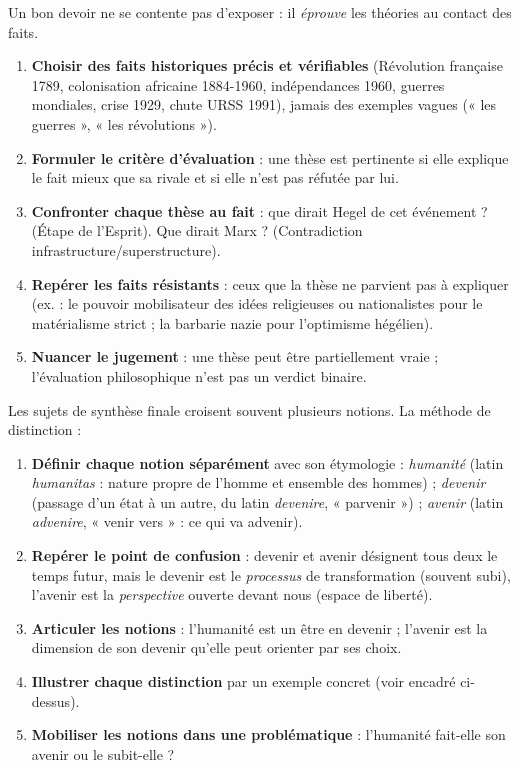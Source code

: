 \documentclass[11pt]{article}
\begin{document}
\begin{methode}
Un bon devoir ne se contente pas d'exposer : il \emph{éprouve} les théories au contact des faits.
\begin{enumerate}
\item \textbf{Choisir des faits historiques précis et vérifiables} (Révolution française 1789, colonisation africaine 1884-1960, indépendances 1960, guerres mondiales, crise 1929, chute URSS 1991), jamais des exemples vagues (« les guerres », « les révolutions »).
\item \textbf{Formuler le critère d'évaluation} : une thèse est pertinente si elle explique le fait mieux que sa rivale et si elle n'est pas réfutée par lui.
\item \textbf{Confronter chaque thèse au fait} : que dirait Hegel de cet événement ? (Étape de l'Esprit). Que dirait Marx ? (Contradiction infrastructure/superstructure).
\item \textbf{Repérer les faits résistants} : ceux que la thèse ne parvient pas à expliquer (ex. : le pouvoir mobilisateur des idées religieuses ou nationalistes pour le matérialisme strict ; la barbarie nazie pour l'optimisme hégélien).
\item \textbf{Nuancer le jugement} : une thèse peut être partiellement vraie ; l'évaluation philosophique n'est pas un verdict binaire.
\end{enumerate}
\end{methode}

\begin{methode}
Les sujets de synthèse finale croisent souvent plusieurs notions. La méthode de distinction :
\begin{enumerate}
\item \textbf{Définir chaque notion séparément} avec son étymologie : \emph{humanité} (latin \emph{humanitas} : nature propre de l'homme et ensemble des hommes) ; \emph{devenir} (passage d'un état à un autre, du latin \emph{devenire}, « parvenir ») ; \emph{avenir} (latin \emph{advenire}, « venir vers » : ce qui va advenir).
\item \textbf{Repérer le point de confusion} : devenir et avenir désignent tous deux le temps futur, mais le devenir est le \emph{processus} de transformation (souvent subi), l'avenir est la \emph{perspective} ouverte devant nous (espace de liberté).
\item \textbf{Articuler les notions} : l'humanité est un être en devenir ; l'avenir est la dimension de son devenir qu'elle peut orienter par ses choix.
\item \textbf{Illustrer chaque distinction} par un exemple concret (voir encadré ci-dessus).
\item \textbf{Mobiliser les notions dans une problématique} : l'humanité fait-elle son avenir ou le subit-elle ?
\end{enumerate}
\end{methode}
\end{document}
